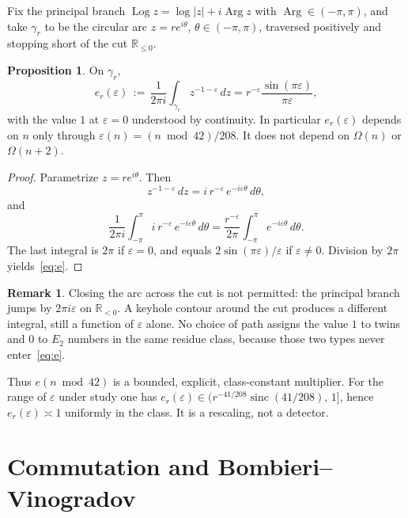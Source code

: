 \documentclass[11pt,a4paper]{article}
\theoremstyle{plain}
\theoremstyle{definition}
\newtheorem{remark}{Remark}
\newtheorem{proposition}{Proposition}
\theoremstyle{plain}
\numberwithin{equation}{section}
\begin{document}
Fix the principal branch \(\operatorname{Log} z=\log|z|+i\operatorname{Arg} z\) with \(\operatorname{Arg}\in(-\pi,\pi)\), and take \(\gamma_r\) to be the circular arc \(z=re^{i\theta}\), \(\theta\in(-\pi,\pi)\), traversed positively and stopping short of the cut \(\mathbb{R}_{\le 0}\).

\begin{proposition}
\label{prop:e}
On \(\gamma_r\),
\begin{equation}
\label{eq:e}
e_r(\varepsilon)\,:=\,\frac{1}{2\pi i}\int_{\gamma_r}z^{-1-\varepsilon}\,dz
=r^{-\varepsilon}\frac{\sin(\pi\varepsilon)}{\pi\varepsilon},
\end{equation}
with the value \(1\) at \(\varepsilon=0\) understood by continuity. In particular \(e_r(\varepsilon)\) depends on \(n\) only through \(\varepsilon(n)=(n\bmod 42)/208\). It does not depend on \(\Omega(n)\) or \(\Omega(n+2)\).
\end{proposition}

\begin{proof}
Parametrize \(z=re^{i\theta}\). Then
\[
z^{-1-\varepsilon}\,dz=i\,r^{-\varepsilon}\,e^{-i\varepsilon\theta}\,d\theta,
\]
and
\[
\frac{1}{2\pi i}\int_{-\pi}^{\pi}i\,r^{-\varepsilon}\,e^{-i\varepsilon\theta}\,d\theta
=\frac{r^{-\varepsilon}}{2\pi}\int_{-\pi}^{\pi}e^{-i\varepsilon\theta}\,d\theta.
\]
The last integral is \(2\pi\) if \(\varepsilon=0\), and equals \(2\sin(\pi\varepsilon)/\varepsilon\) if \(\varepsilon\neq 0\). Division by \(2\pi\) yields~\eqref{eq:e}.
\end{proof}

\begin{remark}
Closing the arc across the cut is not permitted: the principal branch jumps by \(2\pi i\varepsilon\) on \(\mathbb{R}_{<0}\). A keyhole contour around the cut produces a different integral, still a function of \(\varepsilon\) alone. No choice of path assigns the value \(1\) to twins and \(0\) to \(E_2\) numbers in the same residue class, because those two types never enter~\eqref{eq:e}.
\end{remark}

Thus \(e(n\bmod 42)\) is a bounded, explicit, class-constant multiplier. For the range of \(\varepsilon\) under study one has \(e_r(\varepsilon)\in\bigl(r^{-41/208}\operatorname{sinc}(41/208),\,1\bigr]\), hence \(e_r(\varepsilon)\asymp 1\) uniformly in the class. It is a rescaling, not a detector.

\section{Commutation and Bombieri--Vinogradov}
\label{sec:BV}
\end{document}

